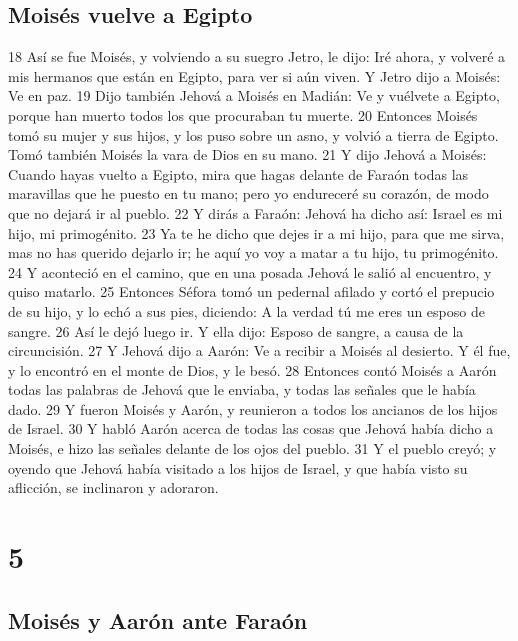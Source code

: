 \section*{Moisés vuelve a Egipto}

18 Así se fue Moisés, y volviendo a su suegro Jetro, le dijo: Iré ahora, y volveré a mis hermanos que están en Egipto, para ver si aún viven. Y Jetro dijo a Moisés: Ve en paz.
19 Dijo también Jehová a Moisés en Madián: Ve y vuélvete a Egipto, porque han muerto todos los que procuraban tu muerte.
20 Entonces Moisés tomó su mujer y sus hijos, y los puso sobre un asno, y volvió a tierra de Egipto. Tomó también Moisés la vara de Dios en su mano.
21 Y dijo Jehová a Moisés: Cuando hayas vuelto a Egipto, mira que hagas delante de Faraón todas las maravillas que he puesto en tu mano; pero yo endureceré su corazón, de modo que no dejará ir al pueblo.
22 Y dirás a Faraón: Jehová ha dicho así: Israel es mi hijo, mi primogénito.
23 Ya te he dicho que dejes ir a mi hijo, para que me sirva, mas no has querido dejarlo ir; he aquí yo voy a matar a tu hijo, tu primogénito.
24 Y aconteció en el camino, que en una posada Jehová le salió al encuentro, y quiso matarlo.
25 Entonces Séfora tomó un pedernal afilado y cortó el prepucio de su hijo, y lo echó a sus pies, diciendo: A la verdad tú me eres un esposo de sangre.
26 Así le dejó luego ir. Y ella dijo: Esposo de sangre, a causa de la circuncisión.
27 Y Jehová dijo a Aarón: Ve a recibir a Moisés al desierto. Y él fue, y lo encontró en el monte de Dios, y le besó.
28 Entonces contó Moisés a Aarón todas las palabras de Jehová que le enviaba, y todas las señales que le había dado.
29 Y fueron Moisés y Aarón, y reunieron a todos los ancianos de los hijos de Israel.
30 Y habló Aarón acerca de todas las cosas que Jehová había dicho a Moisés, e hizo las señales delante de los ojos del pueblo.
31 Y el pueblo creyó; y oyendo que Jehová había visitado a los hijos de Israel, y que había visto su aflicción, se inclinaron y adoraron.

\chapter{5}

\section*{Moisés y Aarón ante Faraón}

